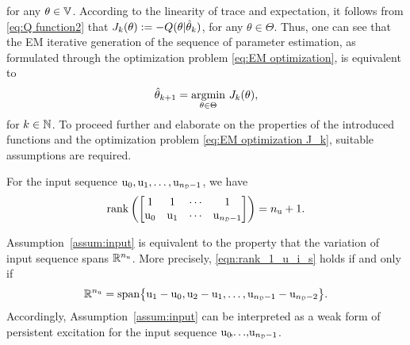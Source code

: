 for any $\theta\in{\mathbb{V}}$.
According to the linearity of trace and expectation, it follows from \eqref{eq:Q function2} that
$J_k({ \mathrm{\theta} }) := -Q({ \mathrm{\theta} }|\hat{{ \mathrm{\theta} }}_k)$,
for any $\theta\in\Theta$.
Thus, one can see that the EM iterative generation of the sequence of parameter estimation, as formulated through the optimization problem \eqref{eq:EM optimization}, is equivalent to
\begin{equation}\label{eq:EM optimization J_k}
\begin{split}
    \hat{\vctheta}_{k+1}
    &=
    \argminOp_{\vctheta \in \Theta}\,
    J_k(\vctheta),\\
\end{split}
\end{equation}
for $k \in {\mathbb{N}}$. 
To proceed further and elaborate on the properties of the introduced functions and the optimization problem \eqref{eq:EM optimization J_k}, suitable assumptions are required.

\begin{assumption}\label{assum:input}
For the input sequence     
$\vcu_0,\vcu_1,\ldots,\vcu_{\nsmD-1}$, we have 
\begin{equation} \label{eqn:rank_1_u_i_s}
    \rank\left(
    \begin{bmatrix} 
    1       & 1      & \cdots & 1 \\
    \vcu_0  & \vcu_1 & \cdots & \vcu_{\nsmD-1}
    \end{bmatrix}
    \right) = \Nu+1.
\end{equation}
\end{assumption}

\begin{remark}
    Assumption~\ref{assum:input} is equivalent to the property that the variation of input sequence spans ${\mathbb{R}}^{n_{ \mathrm{u} }}$. More precisely, \eqref{eqn:rank_1_u_i_s} holds if and only if
    \begin{equation}
        \Rbb^{\Nu}
        =
        \linspan
        \big\{
        \vcu_1 - \vcu_0,
        \vcu_2 - \vcu_1, 
        \ldots,
        \vcu_{\nsmD-1} - \vcu_{\nsmD-2}
        \big\}.
    \end{equation}
    Accordingly, Assumption~\ref{assum:input} can be interpreted as a weak form of persistent excitation for the input sequence 
    $\vcu_0\!,\!\ldots\!,\!\vcu_{\nsmD-1}$.
\end{remark}

